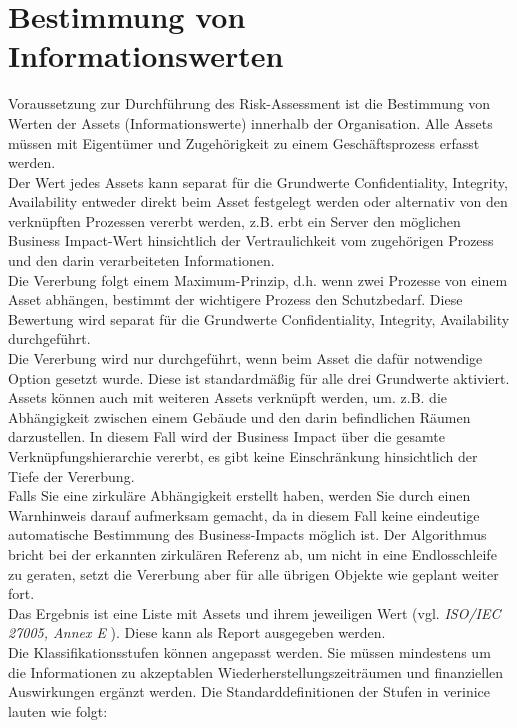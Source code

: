 \documentclass[a4paper,10pt]{book}
\begin{document}
\section{Bestimmung von Informationswerten}
Voraussetzung zur Durchführung des Risk-Assessment ist die Bestimmung von Werten der Assets
(Informationswerte) innerhalb der Organisation. Alle Assets müssen mit Eigentümer und
Zugehörigkeit zu einem Geschäftsprozess erfasst werden.
\newline\\
Der Wert jedes Assets kann separat für die Grundwerte Confidentiality, Integrity, Availability entweder direkt beim
Asset festgelegt werden oder alternativ von den verknüpften Prozessen vererbt werden, z.B. erbt ein Server den möglichen Business Impact-Wert
hinsichtlich der Vertraulichkeit vom zugehörigen Prozess und den darin
verarbeiteten Informationen.
\newline\\
Die Vererbung folgt einem Maximum-Prinzip, d.h. wenn zwei Prozesse von einem
Asset abhängen, bestimmt der wichtigere Prozess den Schutzbedarf. Diese
Bewertung wird separat für die Grundwerte Confidentiality, Integrity, Availability durchgeführt.
\newline\\
Die Vererbung wird nur durchgeführt, wenn beim Asset die dafür notwendige
Option gesetzt wurde. Diese ist standardmäßig für alle drei Grundwerte
aktiviert.
\newline\\
Assets können auch mit weiteren Assets verknüpft werden, um. z.B. die
Abhängigkeit zwischen einem Gebäude und den darin befindlichen Räumen
darzustellen. In diesem Fall wird der Business Impact über die gesamte
Verknüpfungshierarchie vererbt, es gibt keine Einschränkung hinsichtlich der
Tiefe der Vererbung.
\newline\\
Falls Sie eine zirkuläre Abhängigkeit erstellt
haben, werden Sie durch einen Warnhinweis darauf aufmerksam gemacht, da in diesem
Fall keine eindeutige automatische Bestimmung des Business-Impacts möglich ist.
Der Algorithmus bricht bei der erkannten zirkulären Referenz ab, um nicht in
eine Endlosschleife zu geraten, setzt die Vererbung aber für alle übrigen
Objekte wie geplant weiter fort.
\newline\\
Das Ergebnis ist eine Liste mit Assets und ihrem jeweiligen Wert (vgl. \textit{ISO/IEC 27005, Annex E} ). Diese kann als Report ausgegeben werden.
\newline\\
Die Klassifikationsstufen können angepasst werden. Sie müssen mindestens um die Informationen zu akzeptablen Wiederherstellungszeiträumen und
finanziellen Auswirkungen ergänzt werden. Die Standarddefinitionen der Stufen in verinice lauten wie folgt:
\end{document}
